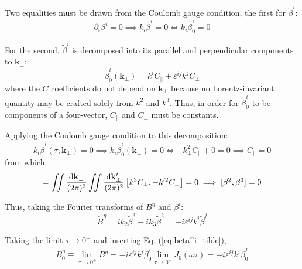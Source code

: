 Two equalities must be drawn from the Coulomb gauge condition, the first for $\tilde{\beta}^i$:
\begin{equation}
	\partial_i \beta^i = 0 \implies k_i \tilde{\beta}^i = 0 \Leftrightarrow k_i \tilde{\beta}^i_0 = 0
\label{eq:app_coulomb_gauge}
\end{equation}

For the second, $\tilde{\beta}^i$ is decomposed into its parallel and perpendicular components to $\mathbf{k}_\perp$: 
\begin{equation}
	\tilde{\beta}^i_0(\mathbf{k}_\perp) = k^i C_\parallel + \varepsilon^{ij} k^j C_\perp
\end{equation}
where the $C$ coefficients do not depend on $\mathbf{k}_\perp$ because no Lorentz-invariant quantity may be crafted solely from $k^2$ and $k^3$. Thus, in order for $\tilde{\beta}^i_0$ to be components of a four-vector, $C_\parallel$ and $C_\perp$ must be constants. 

Applying the Coulomb gauge condition to this decomposition:
\begin{equation}
	k_i \tilde{\beta}^i(\tau, \mathbf{k}_\perp) = 0 \implies k_i \tilde{\beta}^i_0(\mathbf{k}_\perp) = 0 \Leftrightarrow -k_\perp^2 C_\parallel + 0 = 0 \implies C_\parallel = 0
\end{equation}
from which
\begin{equation}
	[\beta_0^2, \beta_0^3] = \iint \frac{\diff \mathbf{k}_\perp}{(2\pi)^2} \iint \frac{\diff \mathbf{k_\perp'}}{(2\pi)^2} \left[k^3 C_\perp , -k'^2 C_\perp\right] = 0 \implies [\beta^2,\beta^3] = 0
\end{equation}

Thus, taking the Fourier transforms of $B^\eta$ and $\beta^i$:
\begin{equation}
	\tilde{B}^\eta = ik_2 \tilde{\beta}^3 - ik_3 \tilde{\beta}^2 = - i \varepsilon^{ij} k^i \tilde{\beta}^j
\end{equation}

Taking the limit $\tau \to 0^+$ and inserting Eq. (\ref{eq:beta^i_tilde}),
\begin{equation}
	B^\eta_0 \equiv \lim_{\tau \to 0^+} B^\eta =  - i \varepsilon^{ij} k^i \tilde{\beta}^j_0 \lim_{\tau \to 0^+} J_0(\omega \tau) = - i \varepsilon^{ij} k^i \tilde{\beta}^j_0
\end{equation}

